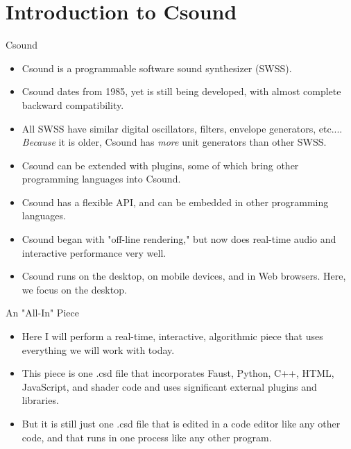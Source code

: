 \documentclass{beamer}
\begin{document}
    \section{Introduction to Csound}
    \begin{frame}{Csound}
        \begin{itemize}
            \item Csound is a programmable software sound synthesizer (SWSS).
            \item Csound dates from 1985, yet is still being developed, with almost
            complete backward compatibility.
            \item All SWSS have similar digital oscillators, filters, envelope generators, etc....
            \textit{Because} it is older, Csound has \textit{more} unit generators
            than other SWSS.
            \item Csound can be extended with plugins, some of which bring other
            programming languages into Csound. 
            \item Csound has a flexible API, and can be embedded in other
            programming languages.
            \item Csound began with "off-line rendering," but now does real-time
            audio and interactive performance very well.
            \item Csound runs on the desktop, on mobile devices, and in Web
            browsers. Here, we focus on the desktop. 
        \end{itemize}
    \end{frame}
    \begin{frame}{An "All-In" Piece}
        \begin{itemize}
            \item Here I will perform a real-time, interactive, algorithmic piece
            that uses everything we will work with today.
            \item This piece is one .csd file that incorporates Faust, Python, C++,
            HTML, JavaScript, and shader code and uses significant external plugins and
            libraries.
            \item But it is still just one .csd file that is edited in a code editor
            like any other code, and that runs in one process like any other program.
        \end{itemize}
    \end{frame}
    
\end{document}
